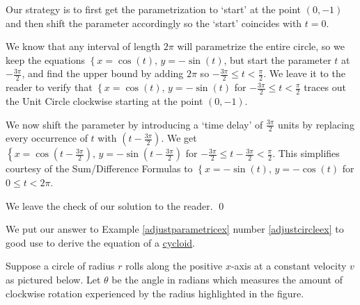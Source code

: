 \documentclass{ximera}
\begin{document}
\begin{ex}
\begin{enumerate}
\smallskip

Our strategy is to first get the parametrization to `start' at the point $(0,-1)$ and then shift the parameter accordingly so the `start' coincides with $t = 0$.  

\smallskip

We know that any interval of length $2\pi$ will parametrize the entire circle, so we keep the equations $\left\{ x = \cos(t), \, y = -\sin(t) \right.$, but start the parameter $t$ at $-\frac{3\pi}{2}$, and find the upper bound by adding $2\pi$ so $-\frac{3\pi}{2} \leq t < \frac{\pi}{2}$.  We leave it to the reader to  verify that   $\left\{ x = \cos(t), \, y = -\sin(t) \right.$ for $-\frac{3\pi}{2} \leq t < \frac{\pi}{2}$ traces out the Unit Circle clockwise starting at the point $(0, -1)$.  

\smallskip

We now shift the parameter by introducing a `time delay' of $\frac{3\pi}{2}$ units by replacing every occurrence of $t$ with $\left(t - \frac{3\pi}{2}\right)$.  We get $\left\{ x = \cos\left(t - \frac{3\pi}{2}\right), \, y = -\sin\left(t - \frac{3\pi}{2}\right) \right.$ for  $-\frac{3\pi}{2} \leq t - \frac{3\pi}{2} < \frac{\pi}{2}$.  This simplifies courtesy of the Sum/Difference Formulas to $\left\{ x = -\sin(t), \, y = -\cos(t) \right.$ for $ 0 \leq t  < 2\pi$.

\smallskip

We leave the check of our solution to the reader.  \qed

\end{enumerate}

\end{ex}

We put our answer to Example \ref{adjustparametricex} number \ref{adjustcircleex} to good use to derive the equation of a  \href{http://en.wikipedia.org/wiki/Cycloid}{\underline{cycloid}}. 

\smallskip

 Suppose a circle of radius $r$ rolls along the positive $x$-axis at a constant velocity $v$ as pictured below.  Let $\theta$ be the angle in radians which measures the amount of clockwise rotation experienced by the radius highlighted in the figure.  
\end{document}
